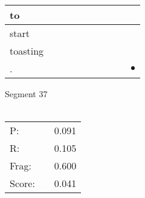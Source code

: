 \documentclass[landscape]{article}
\newcommand{\ssp}{\hspace{2pt}}
\newcommand{\mex}{\cellcolor{g}$\bullet$}
\begin{document}
\begin{tabular}{|l|p{10pt}|p{10pt}|p{10pt}|p{10pt}|p{10pt}|p{10pt}|p{10pt}|p{10pt}|p{10pt}|}
\hline
\ssp to \ssp&\hspace{2pt}&\hspace{2pt}&\hspace{2pt}&\hspace{2pt}&\hspace{2pt}&\hspace{2pt}&\hspace{2pt}&\hspace{2pt}&\hspace{2pt}\\
\hline
\ssp start \ssp&\hspace{2pt}&\hspace{2pt}&\hspace{2pt}&\hspace{2pt}&\hspace{2pt}&\hspace{2pt}&\hspace{2pt}&\hspace{2pt}&\hspace{2pt}\\
\hline
\ssp toasting \ssp&\hspace{2pt}&\hspace{2pt}&\hspace{2pt}&\hspace{2pt}&\hspace{2pt}&\hspace{2pt}&\hspace{2pt}&\hspace{2pt}&\hspace{2pt}\\
\hline
\ssp \cellcolor{ref8}. \ssp&\hspace{2pt}&\hspace{2pt}&\hspace{2pt}&\hspace{2pt}&\hspace{2pt}&\hspace{2pt}&\hspace{2pt}&\hspace{2pt}&\hspace{2pt}\mex\\
\hline
\end{tabular}

\vspace{6pt}
\noindent Segment 37\\\\
\noindent\begin{tabular}{lm{12pt}r}
\hline
P:&&0.091\\
R:&&0.105\\
Frag:&&0.600\\
Score:&&0.041\\
\end{tabular}
\end{document}
